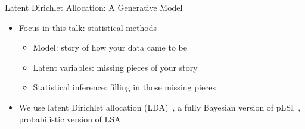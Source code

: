 \documentclass[xcolor=dvipsnames]{beamer}
\begin{document}
\begin{frame}{Latent Dirichlet Allocation: A Generative Model}

\begin{itemize}
\item Focus in this talk: statistical methods
  \begin{itemize}
    \item Model: story of how your data came to be
    \item Latent variables: missing pieces of your story
    \item Statistical inference: filling in those missing pieces
  \end{itemize}
\item We use latent Dirichlet allocation (LDA)~\cite{blei-03}, a fully Bayesian
  version of pLSI~\cite{hofmann-99}, probabilistic version of
  LSA~\cite{landauer-97}
\end{itemize}

\end{frame}
\end{document}
